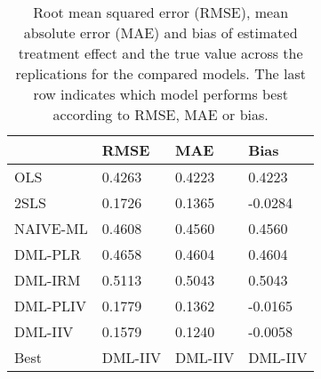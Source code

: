 \begin{table}[H]
\centering
\caption{Root mean squared error (RMSE), mean absolute error (MAE) and bias of estimated treatment effect and the true value across the replications for the compared models. The last row indicates which model performs best according to RMSE, MAE or bias.}
\label{Scenario4}
\begin{tabular}{L{3.3333333333333335cm}L{2.6666666666666665cm}R{2.0cm}R{2.6666666666666665cm}}
\toprule
 & RMSE & MAE & Bias \\
\midrule
OLS & 0.4263 & 0.4223 & 0.4223 \\
2SLS & 0.1726 & 0.1365 & -0.0284 \\
NAIVE-ML & 0.4608 & 0.4560 & 0.4560 \\
DML-PLR & 0.4658 & 0.4604 & 0.4604 \\
DML-IRM & 0.5113 & 0.5043 & 0.5043 \\
DML-PLIV & 0.1779 & 0.1362 & -0.0165 \\
DML-IIV & 0.1579 & 0.1240 & -0.0058 \\
Best & DML-IIV & DML-IIV & DML-IIV \\
\bottomrule
\end{tabular}
\end{table}
